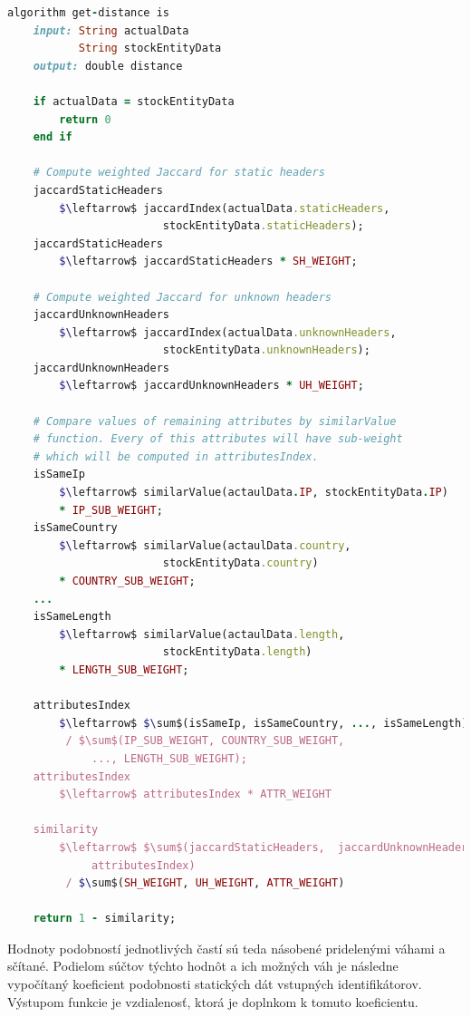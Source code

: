 \documentclass[
  digital, %
  table,   %
  lof,     %
  nolot,   %
  nocover
]{fithesis3}
\begin{document}
\vspace{6mm}
\begin{lstlisting}[basicstyle=\footnotesize, language=Ruby, mathescape=true]
algorithm get-distance is
    input: String actualData
           String stockEntityData
    output: double distance

    if actualData = stockEntityData
        return 0
    end if

    # Compute weighted Jaccard for static headers
    jaccardStaticHeaders 
    	$\leftarrow$ jaccardIndex(actualData.staticHeaders, 
    	                stockEntityData.staticHeaders);
    jaccardStaticHeaders 
    	$\leftarrow$ jaccardStaticHeaders * SH_WEIGHT;

    # Compute weighted Jaccard for unknown headers
    jaccardUnknownHeaders 
    	$\leftarrow$ jaccardIndex(actualData.unknownHeaders,
    	                stockEntityData.unknownHeaders);
    jaccardUnknownHeaders 
    	$\leftarrow$ jaccardUnknownHeaders * UH_WEIGHT;

    # Compare values of remaining attributes by similarValue
    # function. Every of this attributes will have sub-weight
    # which will be computed in attributesIndex.
    isSameIp 
    	$\leftarrow$ similarValue(actaulData.IP, stockEntityData.IP)
    	* IP_SUB_WEIGHT;
    isSameCountry 
    	$\leftarrow$ similarValue(actaulData.country, 
    	                stockEntityData.country)
    	* COUNTRY_SUB_WEIGHT;
    ...
    isSameLength 
    	$\leftarrow$ similarValue(actaulData.length, 
    	                stockEntityData.length)
    	* LENGTH_SUB_WEIGHT;

    attributesIndex 
    	$\leftarrow$ $\sum$(isSameIp, isSameCountry, ..., isSameLength) 
    	 / $\sum$(IP_SUB_WEIGHT, COUNTRY_SUB_WEIGHT,
    	     ..., LENGTH_SUB_WEIGHT);
    attributesIndex 
    	$\leftarrow$ attributesIndex * ATTR_WEIGHT

    similarity 
    	$\leftarrow$ $\sum$(jaccardStaticHeaders,  jaccardUnknownHeaders,
    	     attributesIndex) 
    	 / $\sum$(SH_WEIGHT, UH_WEIGHT, ATTR_WEIGHT)

    return 1 - similarity;
\end{lstlisting}

Hodnoty podobností jednotlivých častí sú teda násobené pridelenými váhami a
sčítané. Podielom súčtov týchto hodnôt a ich možných váh je následne vypočítaný
koeficient podobnosti statických dát vstupných identifikátorov. Výstupom 
funkcie je vzdialenosť, ktorá je doplnkom k tomuto koeficientu.
\end{document}
